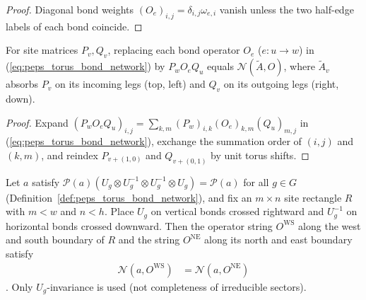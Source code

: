 \begin{proof}\leanok
    Diagonal bond weights $(O_e)_{i,j}=\delta_{i,j}\omega_{e,i}$ vanish unless the two half-edge labels of each bond coincide.
\end{proof}

\begin{lemma}%
    \label{lem:peps_torus_bond_network_gauge}
    \leanok
    For site matrices $P_v,Q_v$, replacing each bond operator $O_e$ ($e:u\to w$) in (\ref{eq:peps_torus_bond_network}) by $P_w O_e Q_u$ equals $\mathcal N(\widetilde A,O)$, where $\widetilde A_v$ absorbs $P_v$ on its incoming legs (top, left) and $Q_v$ on its outgoing legs (right, down).
\end{lemma}

\begin{proof}\leanok
    Expand $(P_w O_e Q_u)_{i,j}=\sum_{k,m}(P_w)_{i,k}(O_e)_{k,m}(Q_u)_{m,j}$ in (\ref{eq:peps_torus_bond_network}), exchange the summation order of $(i,j)$ and $(k,m)$, and reindex $P_{v+(1,0)}$ and $Q_{v+(0,1)}$ by unit torus shifts.
\end{proof}

\begin{lemma}%
    \label{thm:peps_torus_operator_string_deformation}
    \leanok
    Let $a$ satisfy $\mathcal{P}(a)(U_g\otimes U_g^{-1}\otimes U_g^{-1}\otimes U_g)=\mathcal{P}(a)$ for all $g\in G$ (Definition~\ref{def:peps_torus_bond_network}), and fix an $m\times n$ site rectangle $R$ with $m<w$ and $n<h$. Place $U_g$ on vertical bonds crossed rightward and $U_g^{-1}$ on horizontal bonds crossed downward. Then the operator string $O^{\mathrm{WS}}$ along the west and south boundary of $R$ and the string $O^{\mathrm{NE}}$ along its north and east boundary satisfy
    \begin{align}
        \mathcal N(a,O^{\mathrm{WS}}) & =\mathcal N(a,O^{\mathrm{NE}})
        \label{eq:peps_torus_string_deformation}
    \end{align}
    \cite[Section~``Two dimensions: $G$-injective PEPS'', eq.~(2d:move-strings) and Lemma~``Deformations of the string'']{Schuch2010PEPS}. Only $U_g$-invariance is used (not completeness of irreducible sectors).
\end{lemma}

